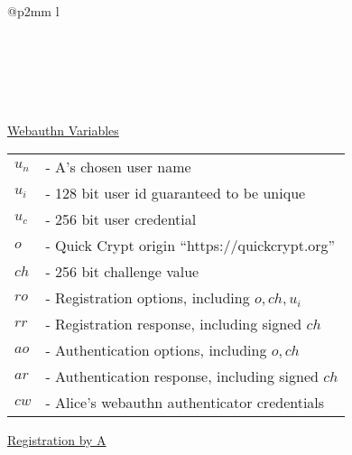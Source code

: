 \documentclass{article}
\begin{document}
\begin{tabular}{@{}p{2mm} l}
\\
\\
\\
\\
\\
\\
\end{tabular}

\newpage

\underline{Webauthn Variables}\\

\begin{tabular}{@{}p{2mm} l}
$u_n$ & \textrm{ - A's chosen user name} \\
$u_i$ & \textrm{ - 128 bit user id guaranteed to be unique} \\
$u_c$ & \textrm{ - 256 bit user credential}\\
$o$ & \textrm{ - Quick Crypt origin ``https://quickcrypt.org''} \\
$ch$ & \textrm{ - 256 bit challenge value} \\
$ro$ & \textrm{ - Registration options, including }$o, ch, u_i$\\
$rr$ & \textrm{ - Registration response, including signed }$ch$\\
$ao$ & \textrm{ - Authentication options, including }$o, ch$\\
$ar$ & \textrm{ - Authentication response, including signed }$ch$\\
$cw$ & \textrm{ - Alice's webauthn authenticator credentials} \\
\end{tabular}

\hfill \break

\underline{Registration by A}\\
\end{document}
